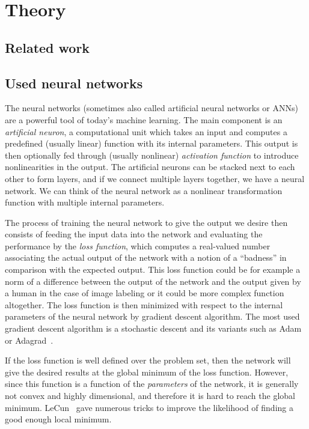 \chapter{Theory}

\section{Related work}


\section{Used neural networks} \label{nets}

The neural networks (sometimes also called artificial neural networks or ANNs) are a powerful tool of today's machine learning. The main component is an {\em artificial neuron}, a computational unit which takes an input and computes a predefined (usually linear) function with its internal parameters. This output is then optionally fed through (usually nonlinear) {\em activation function} to introduce nonlinearities in the output. The artificial neurons can be stacked next to each other to form layers, and if we connect multiple layers together, we have a neural network. We can think of the neural network as a nonlinear transformation function with multiple internal parameters.

The process of training the neural network to give the output we desire then consists of feeding the input data into the network and evaluating the performance by the {\em loss function}, which computes a real-valued number associating the actual output of the network with a notion of a ``badness'' in comparison with the expected output. This loss function could be for example a norm of a difference between the output of the network and the output given by a human in the case of image labeling or it could be more complex function altogether. The loss function is then minimized with respect to the internal parameters of the neural network by gradient descent algorithm. The most used gradient descent algorithm is a stochastic descent and its variants such as Adam~\cite{adam} or Adagrad~\cite{adagrad}.

If the loss function is well defined over the problem set, then the network will give the desired results at the global minimum of the loss function. However, since this function is a function of the {\em parameters} of the network, it is generally not convex and highly dimensional, and therefore it is hard to reach the global minimum. LeCun~\cite{efbackprop} gave numerous tricks to improve the likelihood of finding a good enough local minimum.

